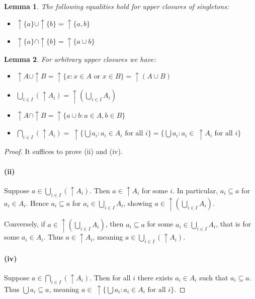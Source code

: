 \documentclass[12pt]{article}
\theoremstyle{definition}
\theoremstyle{plain}
\newtheorem{lemma}{Lemma}[section]
\theoremstyle{plain}
\theoremstyle{plain}
\theoremstyle{plain}
\theoremstyle{remark}
\theoremstyle{remark}
\newcommand{\sub}{\subseteq}
\begin{document}
\begin{tcolorbox}[title = Calculation Rules]
	\begin{lemma} The following equalities hold for upper closures of singletons:
		\begin{itemize}
			\item[(i)] $\uparrow \{a\} \cup \uparrow \{b\} = \uparrow \{a, b\}$
			\item[(ii)] $\uparrow \{a\} \cap \uparrow \{b\} = \uparrow \{ a \cup b\}$
		\end{itemize}
	\end{lemma}

	\begin{lemma} For arbitrary upper closures we have:
		\begin{itemize}
		\item[(i)] $\uparrow A \cup \uparrow B = \uparrow \{x : x \in A \text{ or }  x \in B\} = \uparrow (A \cup B)$
		\item[(ii)] $\bigcup_{i \in I}(\uparrow A_i) = \uparrow (\bigcup_{i \in I}A_i)$
		\item[(iii)]$\uparrow A \cap \uparrow B = \uparrow \{ a \cup b: a \in A, b \in B \}$
		\item[(iv)]$\bigcap_{i \in I}(\uparrow A_i)  = \: \uparrow \!\!\! \{\bigcup a_i: a_i \in A_i \text{ for all } i \} =\{\bigcup a_i: a_i \in \: \uparrow \!\! A_i \text{ for all } i \}$
		\end{itemize}
	\end{lemma}
	\begin{proof}
		It suffices to prove (ii) and (iv). 
		
		\paragraph{(ii)} Suppose $a \in \bigcup_{i \in I}(\uparrow A_i)$. Then $a \in \uparrow A_i$ for some $i$. In particular, $a_i \sub a$ for $a_i \in A_i$. Hence $a_i \sub a$ for $a_i \in \bigcup_{i \in I}A_i$, showing $a \in \uparrow (\bigcup_{i \in I}A_i)$. 
		
		Conversely, if $a \in \uparrow (\bigcup_{i \in I}A_i)$, then $a_i \sub a$ for some $a_i \in \bigcup_{i \in I}A_i$, that is for some $a_i \in A_i$. Thus $a \in \uparrow A_i$, meaning $a \in \bigcup_{i \in I}(\uparrow A_i)$.
		
		\paragraph{(iv)} Suppose $a \in \bigcap_{i \in I}(\uparrow A_i)$. Then for all $i$ there exists $a_i \in A_i$ such that $a_i \sub a$. Thus $\bigcup a_i \sub a$, meaning $a \in \: \uparrow \!\!\! \{\bigcup a_i: a_i \in A_i \text{ for all } i \}$.
		

\end{proof}
\end{tcolorbox}
\end{document}
